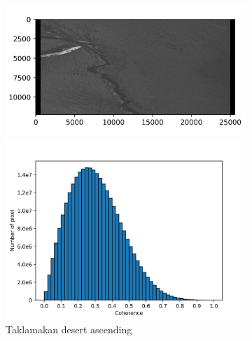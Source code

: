 \documentclass[preprint, authoryear]{elsarticle}
\begin{document}
\begin{figure}
    \centering
    \begin{subfigure}[c]{0.5\textwidth}
        \centering
        \begin{minipage}[c]{0.5\textwidth}
            \centering
            \includegraphics[width=\textwidth]{figure/The coherence/coh_TaklimakanDesert_asc_esd1.png}
        \end{minipage}%
        \begin{minipage}[c]{0.5\textwidth}
            \centering
            \includegraphics[width=\textwidth]{figure/The coherence/coh_TaklimakanDesert_asc_esd1_histogram_.png}
        \end{minipage}
        \caption{Taklamakan desert ascending}
        \label{fig_6a}
    \end{subfigure}%
    \begin{subfigure}[c]{0.5\textwidth}
        \centering
        \begin{minipage}[c]{0.5\textwidth}

\end{minipage}
\end{subfigure}
\end{figure}
\end{document}
